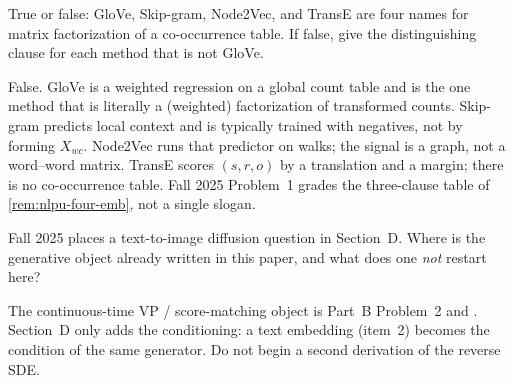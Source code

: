 \begin{exercise}
\label{ex:nlpu-all-mf}
True or false: GloVe, Skip-gram, Node2Vec, and TransE are four names for matrix factorization of a co-occurrence table. If false, give the distinguishing clause for each method that is not GloVe.
\end{exercise}

\begin{solution}
False. GloVe is a weighted regression on a global count table and is the one method that is literally a (weighted) factorization of transformed counts. Skip-gram predicts local context and is typically trained with negatives, not by forming $X_{wc}$. Node2Vec runs that predictor on walks; the signal is a graph, not a word--word matrix. TransE scores $(s,r,o)$ by a translation and a margin; there is no co-occurrence table. Fall 2025 Problem~1 grades the three-clause table of \cref{rem:nlpu-four-emb}, not a single slogan.
\end{solution}

\begin{exercise}
\label{ex:nlpu-diffusion-ptr}
Fall 2025 places a text-to-image diffusion question in Section~D. Where is the generative object already written in this paper, and what does one \emph{not} restart here?
\end{exercise}

\begin{solution}
The continuous-time VP / score-matching object is Part~B Problem~2 and . Section~D only adds the conditioning: a text embedding (item~2) becomes the condition of the same generator. Do not begin a second derivation of the reverse SDE.
\end{solution}


